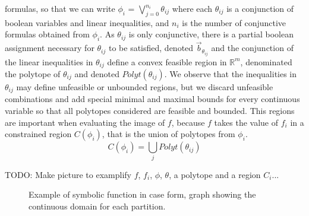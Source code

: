 %
formulas, so that we can write $\phi_i$ =
$\bigvee_{j=0}^{n_i} \theta_{ij}$ where each $\theta_{ij}$ is a
conjunction of boolean variables and linear inequalities, and $n_i$ is
the number of conjunctive formulas obtained from $\phi_i$. As
$\theta_{ij}$ is only conjunctive, there is a partial boolean
assignment necessary for $\theta_{ij}$ to be satisfied, denoted
$\vec{b}_{\theta_{ij}}$ and the conjunction of the linear inequalities
in $\theta_{ij}$ define a convex feasible region in $\mathbb{R}^m$,
denominated the polytope of $\theta_{ij}$ and denoted
$Polyt(\theta_{ij})$. We observe that the inequalities in
$\theta_{ij}$ may define unfeasible or unbounded regions, but we
discard unfeasible combinations and add special minimal and maximal
bounds for every continuous variable so that all polytopes considered
are feasible and bounded. This regions are important when evaluating
the image of $f$, because $f$ takes the value of $f_i$ in a
constrained region $C(\phi_i)$, that is the union of polytopes from
$\phi_i$.
		$$C(\phi_i) = \bigcup_j Polyt(\theta_{ij})$$

TODO: Make picture to examplify $f$, $f_i$, $\phi$, $\theta$, a polytope and a region $C_i$...

\begin{figure}[h!t]
\center
{}
\caption{ Example of symbolic function in case form, graph showing the continuous domain for each partition.}
\label{fig:samplecase} 
\end{figure}

